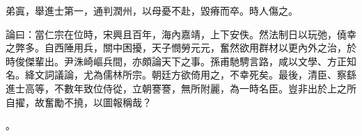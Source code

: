 \begin{pinyinscope}
 弟寘，舉進士第一，通判潤州，以母憂不赴，毀瘠而卒。時人傷之。



 論曰：當仁宗在位時，宋興且百年，海內嘉靖，上下安佚。然法制日以玩弛，僥幸之弊多。自西陲用兵，關中困擾，天子憫勞元元，奮然欲用群材以更內外之治，於時俊傑輩出。尹洙崎嶇兵間，亦頗論天下之事。孫甫馳騁言路，咸以文學、方正知名。絳文詞議論，尤為儒林所宗。朝廷方欲倚用之，不幸死矣。最後，清臣、察繇進士高等，不數年致位侍從，立朝謇謇，無所附麗，為一時名臣。豈非出於上之所自擢，故奮勵不撓，以圖報稱哉？



 。



\end{pinyinscope}
